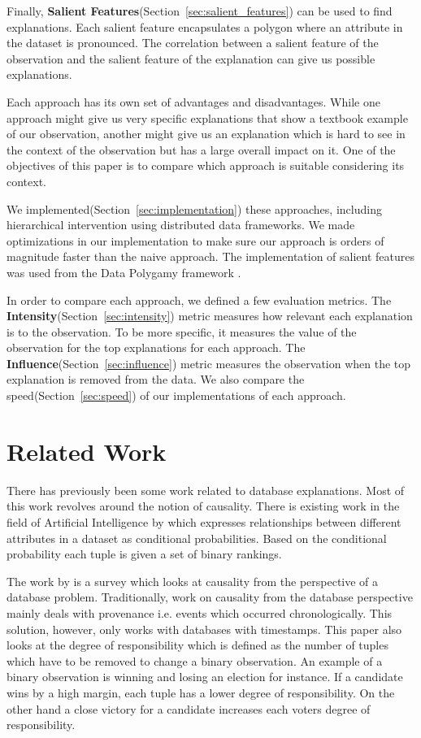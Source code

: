 Finally, \textbf{Salient Features}(Section~\ref{sec:salient_features}) can be used to find explanations\citep{chirigati2016data}. Each salient feature encapsulates a polygon where an attribute in the dataset is pronounced. The correlation between a salient feature of the observation and the salient feature of the explanation can give us possible explanations.

Each approach has its own set of advantages and disadvantages. While one approach might give us very specific explanations that show a textbook example of our observation, another might give us an explanation which is hard to see in the context of the observation but has a large overall impact on it. One of the objectives of this paper is to compare which approach is suitable considering its context.

We implemented(Section~\ref{sec:implementation}) these approaches, including hierarchical intervention using distributed data frameworks\citep{borthakur2007hadoop,dean2008mapreduce,shanahan2015large,zaharia2016apache}. We made optimizations in our implementation to make sure our approach is orders of magnitude faster than the naive approach. The implementation of salient features was used from the Data Polygamy framework \citep{chirigati2016data}.

In order to compare each approach, we defined a few evaluation metrics. The \textbf{Intensity}(Section~\ref{sec:intensity}) metric measures how relevant each explanation is to the observation. To be more specific, it measures the value of the observation for the top explanations for each approach. The \textbf{Influence}(Section~\ref{sec:influence}) metric measures the observation when the top explanation is removed from the data. We also compare the speed(Section~\ref{sec:speed}) of our implementations of each approach.

\section{Related Work}
There has previously been some work related to database explanations. Most of this work revolves around the notion of causality. There is existing work in the field of Artificial Intelligence by \cite{zhang2002discovering} which expresses relationships between different attributes in a dataset as conditional probabilities. Based on the conditional probability each tuple is given a set of binary rankings.

The work by \cite{meliou2010causality} is a survey which looks at causality from the perspective of a database problem. Traditionally, work on causality from the database perspective mainly deals with provenance i.e. events which occurred chronologically. This solution, however, only works with databases with timestamps. This paper also looks at the degree of responsibility which is defined as the number of tuples which have to be removed to change a binary observation. An example of a binary observation is winning and losing an election for instance. If a candidate wins by a high margin, each tuple has a lower degree of responsibility. On the other hand a close victory for a candidate increases each voters degree of responsibility.

